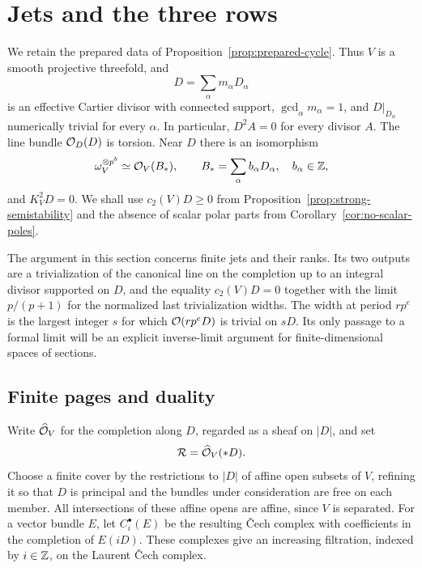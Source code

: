 \section{Jets and the three rows}\label{sec:jets}

We retain the prepared data of Proposition~\ref{prop:prepared-cycle}.
Thus $V$ is a smooth projective threefold, and
\[
 D=\sum_\alpha m_\alpha D_\alpha
\]
is an effective Cartier divisor with connected support,
$\gcd_\alpha m_\alpha=1$, and $D|_{D_\alpha}$ numerically trivial
for every $\alpha$. In particular, $D^2A=0$ for every divisor $A$.
The line bundle $\mathcal O_D(D)$ is torsion. Near $D$ there is an
isomorphism
\begin{equation}\label{eq:canonical-p-power}
 \omega_V^{\otimes p^b}\simeq\mathcal O_V(B_*),\qquad
 B_*=\sum_\alpha b_\alpha D_\alpha,
 \quad b_\alpha\in\mathbb Z,
\end{equation}
and $K_V^2D=0$. We shall use
$c_2(V)D\geq0$ from Proposition~\ref{prop:strong-semistability}
and the absence of scalar polar parts from
Corollary~\ref{cor:no-scalar-poles}.

The argument in this section concerns finite jets and their ranks.
Its two outputs are a trivialization of the canonical line on the
completion up to an integral divisor supported on $D$, and the equality
$c_2(V)D=0$ together with the limit $p/(p+1)$ for the normalized last
trivialization widths.  The width at period $rp^e$ is the largest
integer $s$ for which $\mathcal O(rp^eD)$ is trivial on $sD$.
Its only passage to a formal limit will be an explicit inverse-limit
argument for finite-dimensional spaces of sections.

\subsection{Finite pages and duality}

Write $\widehat{\mathcal O}_V$ for the completion along $D$, regarded as
a sheaf on $|D|$, and set
\[
 \mathcal R=\widehat{\mathcal O}_V(*D).
\]
Choose a finite cover by the restrictions to $|D|$ of affine open
subsets of $V$, refining it so that $D$ is principal and the bundles
under consideration are free on each member. All intersections of
these affine opens are affine, since $V$ is separated. For a vector
bundle $E$, let $C_i^\bullet(E)$ be the resulting \v{C}ech complex
with coefficients in the completion of $E(iD)$. These complexes
give an increasing filtration, indexed by $i\in\mathbb Z$, on the Laurent
\v{C}ech complex.


